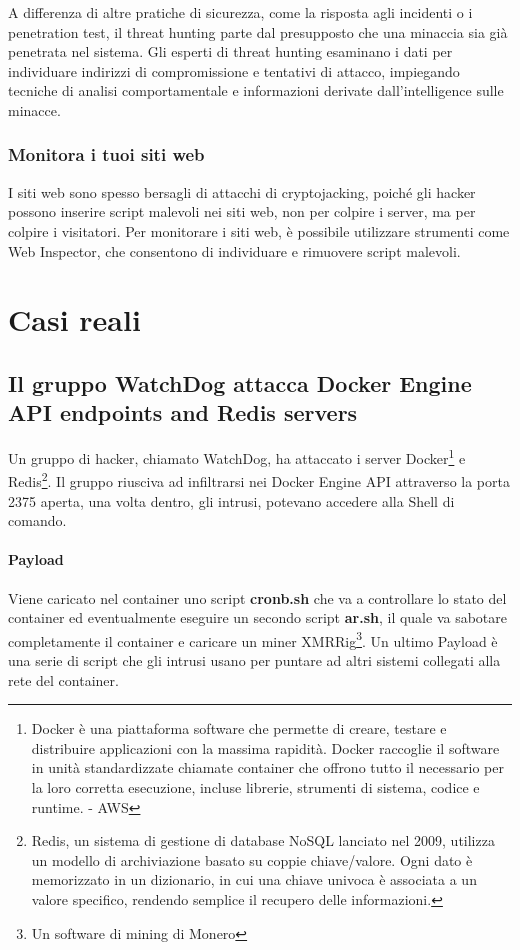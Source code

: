 \documentclass[12pt,a4paper]{article}
\begin{document}
A differenza di altre pratiche di sicurezza, come la risposta agli incidenti o i
penetration test, il threat hunting parte dal presupposto che una minaccia sia
già penetrata nel sistema. Gli esperti di threat hunting esaminano i dati per
individuare indirizzi di compromissione e tentativi di attacco, impiegando
tecniche di analisi comportamentale e informazioni derivate dall'intelligence
sulle minacce.

\subsubsection*{Monitora i tuoi siti web}
I siti web sono spesso bersagli di attacchi di cryptojacking, poiché gli hacker
possono inserire script malevoli nei siti web, non per colpire i server, ma per
colpire i visitatori. Per monitorare i siti web, è possibile utilizzare
strumenti come Web Inspector, che consentono di individuare e rimuovere script
malevoli.

\newpage

\section{Casi reali}

\subsection{Il gruppo WatchDog attacca Docker Engine API endpoints and Redis servers}
Un gruppo di hacker, chiamato WatchDog, ha attaccato i server
Docker\footnote{Docker è una piattaforma software che permette di creare,
testare e distribuire applicazioni con la massima rapidità. Docker raccoglie il
software in unità standardizzate chiamate container che offrono tutto il
necessario per la loro corretta esecuzione, incluse librerie, strumenti di
sistema, codice e runtime. - AWS} e Redis\footnote{Redis, un sistema di gestione
di database NoSQL lanciato nel 2009, utilizza un modello di archiviazione basato
su coppie chiave/valore. Ogni dato è memorizzato in un dizionario, in cui una
chiave univoca è associata a un valore specifico, rendendo semplice il recupero
delle informazioni.}. Il gruppo riusciva ad infiltrarsi nei Docker Engine API
attraverso la porta 2375 aperta, una volta dentro, gli intrusi, potevano
accedere alla Shell di comando.

\paragraph{Payload} Viene caricato nel container uno script \textbf{cronb.sh}
che va a controllare lo stato del container ed eventualmente eseguire un secondo
script \textbf{ar.sh}, il quale va sabotare completamente il container e
caricare un miner XMRRig\footnote{Un software di mining di Monero}. Un ultimo
Payload è una serie di script che gli intrusi usano per puntare ad altri sistemi
collegati alla rete del container.\cite{WatchDog}
\end{document}
